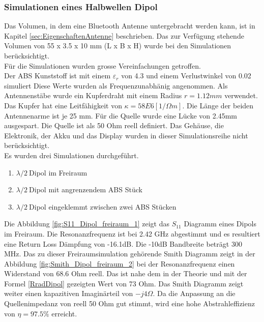 
\newpage
\subsubsection{Simulationen eines Halbwellen Dipol}\label{sim_lamda2_Dipol}

Das Volumen, in dem eine Bluetooth Antenne untergebracht werden kann, ist in Kapitel \ref{sec:EigenschaftenAntenne} beschrieben. Das zur Verfügung stehende Volumen von 55 x 3.5 x 10 mm (L x B x H) wurde bei den Simulationen berücksichtigt. \\
Für die Simulationen wurden grosse Vereinfachungen getroffen.\\
Der ABS Kunststoff ist mit einem $\varepsilon_r $ von 4.3 und einem Verlustwinkel von 0.02 simuliert Diese Werte wurden als Frequenzunabhänig angenommen. Als Antennenstäbe wurde ein  Kupferdraht mit einem Radius $r = 1.12 mm$ verwendet. Das Kupfer hat eine Leitfähigkeit von $\kappa=58E6 [1/\Omega m]$. Die Länge der beiden Antennenarme ist je 25 mm. Für die Quelle wurde eine Lücke von 2.45mm ausgespart. Die Quelle ist als 50 Ohm reell definiert. Das Gehäuse, die Elektronik, der Akku und das Display wurden in dieser Simulationsreihe nicht berücksichtigt.\\ 
Es wurden drei Simulationen durchgeführt.
\begin{enumerate}
\item  $\lambda/2 \ $Dipol im Freiraum
\item  $\lambda/2 \ $Dipol mit angrenzendem ABS Stück
\item  $\lambda/2 \ $Dipol eingeklemmt zwischen zwei ABS Stücken
\end{enumerate}
Die Abbildung \ref{fig:S11_Dipol_freiraum_1} zeigt das $S_{11}$ Diagramm eines Dipols im Freiraum. Die Resonanzfrequenz ist bei 2.42 GHz abgestimmt und es resultiert eine Return Loss Dämpfung von -16.1dB.  Die -10dB Bandbreite beträgt 300 MHz. Das zu dieser Freiraumsimulation gehörende Smith Diagramm zeigt in der Abbildung \ref{fig:Smith_Dipol_freiraum_2}  bei der Resonanzfrequenz einen Widerstand von 68.6 Ohm reell. Das ist nahe dem in der Theorie und mit der Formel \ref{RradDipol} gezeigten Wert von 73 Ohm. Das Smith Diagramm zeigt weiter einen kapazitiven  Imaginärteil von $-j4\Omega$. Da die Anpassung an die Quellenimpedanz von reell 50 Ohm gut stimmt, wird eine hohe Abstrahleffizienz von $\eta = 97.5 \% $ erreicht.


